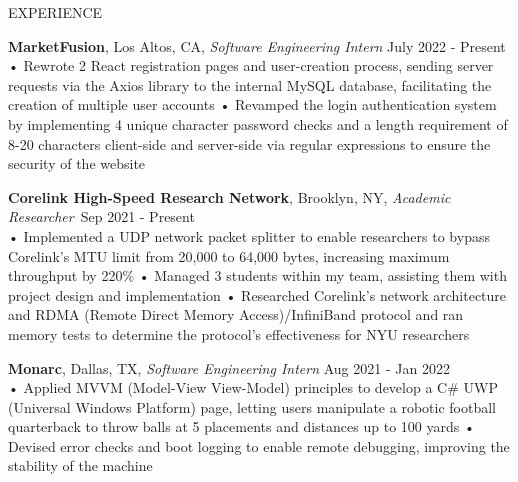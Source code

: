 \documentclass{resume} %
\begin{document}
\begin{rSection}{EXPERIENCE}

\textbf{MarketFusion}, Los Altos, CA, {\emph{Software Engineering Intern}} \hfill July 2022 - Present\\
• Rewrote 2 React registration pages and user-creation process, sending server requests via the Axios library to the internal MySQL database, facilitating the creation of multiple user accounts \newline
• Revamped the login authentication system by implementing 4 unique character password checks and a length requirement of 8-20 characters client-side and server-side via regular expressions to ensure the security of the website 

\textbf{Corelink High-Speed Research Network}, Brooklyn, NY, {\emph{Academic Researcher}}\ \hfill Sep 2021 - Present \\
• Implemented a UDP network packet splitter to enable researchers to bypass Corelink's MTU limit from 20,000 to 64,000 bytes, increasing maximum throughput by 220\% \newline
• Managed 3 students within my team, assisting them with project design and implementation \newline    
• Researched Corelink’s network architecture and RDMA (Remote Direct Memory Access)/InfiniBand protocol and ran memory tests to determine the protocol's effectiveness for NYU researchers

\textbf{Monarc}, Dallas, TX, {\emph{Software Engineering Intern}} \hfill Aug 2021 - Jan 2022\\
• Applied MVVM (Model-View View-Model) principles to develop a C\# UWP (Universal Windows Platform) page, letting users manipulate a robotic football quarterback to throw balls at 5 placements and distances up to 100 yards \newline  %
• Devised error checks and boot logging to enable remote debugging, improving the stability of the machine \smallskip
\end{rSection} 
\end{document}
